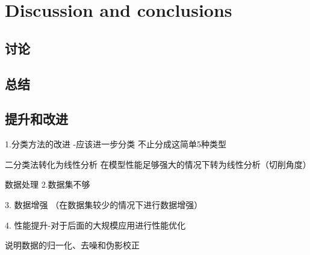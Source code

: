 \section{Discussion and conclusions}
\label{sec:results}

\subsection{讨论}

\subsection{总结}


\subsection{提升和改进}



1.分类方法的改进 -应该进一步分类 不止分成这简单5种类型

二分类法转化为线性分析 在模型性能足够强大的情况下转为线性分析（切削角度）

数据处理
2.数据集不够

3. 数据增强 （在数据集较少的情况下进行数据增强）

4. 性能提升-对于后面的大规模应用进行性能优化

说明数据的归一化、去噪和伪影校正


\FloatBarrier %